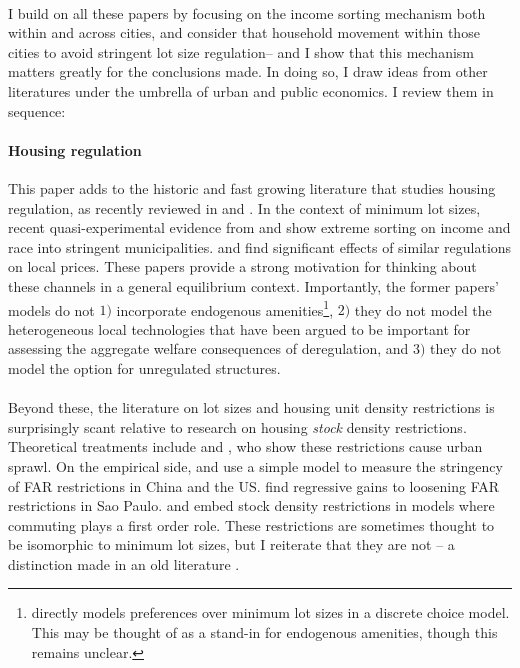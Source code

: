 \documentclass[]{article}
\begin{document}
\paragraph*{}
I build on all these papers by focusing on the income sorting mechanism both within and across cities, and consider that household movement within those cities to avoid stringent lot size regulation-- and I show that this mechanism matters greatly for the conclusions made. In doing so, I draw ideas from other literatures under the umbrella of urban and public economics. I review them in sequence:

\paragraph*{Housing regulation} This paper adds to the historic and fast growing literature that studies housing regulation, as recently reviewed in \cite{gyourkomolloy} and \cite{MolloyRSUE}. In the context of minimum lot sizes, recent quasi-experimental evidence from \cite{Song} and \cite{kulka} show extreme sorting on income and race into stringent municipalities. \cite{KSC} and \cite{zabel} find significant effects of similar regulations on local prices. These papers provide a strong motivation for thinking about these channels in a general equilibrium context. Importantly, the former papers' models do not $1)$ incorporate endogenous amenities\footnote{\cite{Song} directly models preferences over minimum lot sizes in a discrete choice model. This may be thought of as a stand-in for endogenous amenities, though this remains unclear.}, $2)$ they do not model the heterogeneous local technologies that have been argued to be important for assessing the aggregate welfare consequences of deregulation, and $3)$ they do not model the option for unregulated structures.
\paragraph*{}
Beyond these, the literature on lot sizes and housing unit density restrictions is surprisingly scant relative to research on housing \textit{stock} density restrictions. Theoretical treatments include \cite{bbheight} and \cite{mills2005}, who show these restrictions cause urban sprawl. On the empirical side, \cite{BruecknerFuGu} and \cite{bruecknersingh} use a simple model to measure the stringency of FAR restrictions in China and the US. \cite{anagoletal2021} find regressive gains to loosening FAR restrictions in Sao Paulo. \cite{martynov} and \cite{acosta} embed stock density restrictions in models where commuting plays a first order role. These restrictions are sometimes thought to be isomorphic to minimum lot sizes, but I reiterate that they are not --  a distinction made in an old literature \citep{griesonwhite}.
\end{document}
